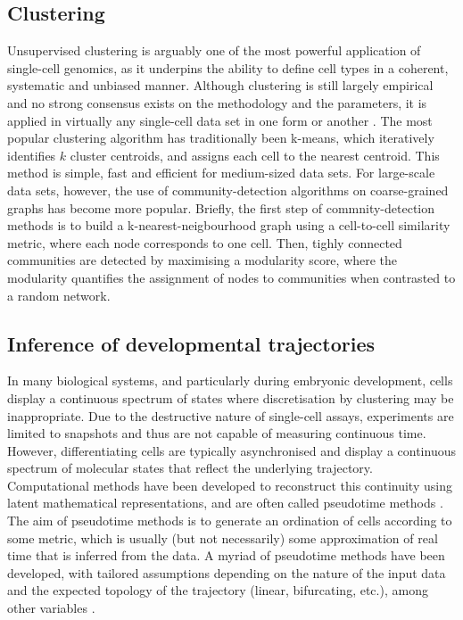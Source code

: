 \subsection{Clustering}

Unsupervised clustering is arguably one of the most powerful application of single-cell genomics, as it underpins the ability to define cell types in a coherent, systematic and unbiased manner. Although clustering is still largely empirical and no strong consensus exists on the methodology and the parameters, it is applied in virtually any single-cell data set in one form or another \cite{Kiselev2019}. The most popular clustering algorithm has traditionally been k-means, which iteratively identifies $k$ cluster centroids, and assigns each cell to the nearest centroid. This method is simple, fast and efficient for medium-sized data sets. For large-scale data sets, however, the use of community-detection algorithms on coarse-grained graphs has become more popular. Briefly, the first step of commnity-detection methods is to build a k-nearest-neigbourhood graph using a cell-to-cell similarity metric, where each node corresponds to one cell. Then, tighly connected communities are detected by maximising a modularity score, where the modularity quantifies the assignment of nodes to communities when contrasted to a random network.

\subsection{Inference of developmental trajectories}

In many biological systems, and particularly during embryonic development, cells display a continuous spectrum of states where discretisation by clustering may be inappropriate. Due to the destructive nature of single-cell assays, experiments are limited to snapshots and thus are not capable of measuring continuous time. However, differentiating cells are typically asynchronised and display a continuous spectrum of molecular states that reflect the underlying trajectory. Computational methods have been developed to reconstruct this continuity using latent mathematical representations, and are often called pseudotime methods \cite{Saelens2019}. The aim of pseudotime methods is to generate an ordination of cells according to some metric, which is usually (but not necessarily) some approximation of real time that is inferred from the data. A myriad of pseudotime methods have been developed, with tailored assumptions depending on the nature of the input data and the expected topology of the trajectory (linear, bifurcating, etc.), among other variables \cite{Saelens2019}. 

